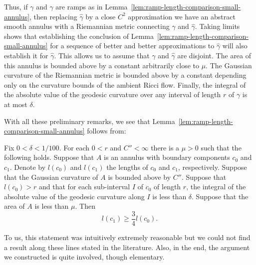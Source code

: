 Thus, if $\gamma$ and $\hat \gamma$ are ramps as in
Lemma~\ref{lem:ramp-length-comparison-small-annulus}, then replacing $\hat \gamma$ by a close $C^2$
approximation we have an abstract smooth annulus with a Riemannian
metric connecting $\gamma$ and $\hat \gamma$. Taking limits shows
that  establishing the conclusion of Lemma~\ref{lem:ramp-length-comparison-small-annulus} for a
sequence of better and better approximations to $\hat \gamma$ will
also establish it for $\hat \gamma$. This allows us to assume that
$\gamma$ and $\hat \gamma$ are disjoint. The area of this annulus is
bounded above by a constant arbitrarily close to $\mu$. The Gaussian
curvature of the Riemannian metric is bounded above by a constant
depending only on the curvature bounds of the ambient Ricci flow.
Finally, the integral of the absolute value of the geodesic
curvature over any interval of length $r$ of $\gamma$ is at most
$\delta$.

With all these preliminary remarks, we see that Lemma~\ref{lem:ramp-length-comparison-small-annulus}
follows from:


\begin{proposition}
\label{prop:annulus-boundary-length-estimate}
\label{annlengthest}
Fix $0<\delta<1/100$.  For each $0<r$ and $C''<\infty$ there is a
$\mu>0$ such that the following holds. Suppose that $A$ is an
annulus with boundary components $c_0$ and $c_1$. Denote by $l(c_0)$
and $l(c_1)$ the lengths of $c_0$ and $c_1$, respectively. Suppose
that the Gaussian curvature of $A$ is bounded above by $C''$.
Suppose that  $l(c_0)>r$ and that for each sub-interval $I$ of $c_0$
of length $r$, the integral of the absolute value of the geodesic
curvature along $I$ is less than $\delta$. Suppose that the area of
$A$ is less than $\mu$. Then
$$l(c_1)\ge \frac{3}{4}l(c_0).$$
\end{proposition}

To us, this statement was intuitively extremely reasonable but we
could not find a result along these lines stated in the literature.
Also, in the end, the argument we constructed is quite involved,
though elementary.


